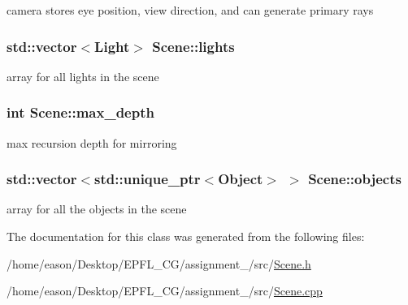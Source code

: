 camera stores eye position, view direction, and can generate primary rays 

\subsubsection[{\texorpdfstring{lights}{lights}}]{\setlength{\rightskip}{0pt plus 5cm}std\+::vector$<${\bf Light}$>$ Scene\+::lights\hspace{0.3cm}{\ttfamily [private]}}\hypertarget{classScene_ab3625e4ac3c6e47156edd23e2421e828}{}\label{classScene_ab3625e4ac3c6e47156edd23e2421e828}


array for all lights in the scene 

\subsubsection[{\texorpdfstring{max\+\_\+depth}{max_depth}}]{\setlength{\rightskip}{0pt plus 5cm}int Scene\+::max\+\_\+depth\hspace{0.3cm}{\ttfamily [private]}}\hypertarget{classScene_a9150039f4d2c46a617b51c7920142d52}{}\label{classScene_a9150039f4d2c46a617b51c7920142d52}


max recursion depth for mirroring 

\subsubsection[{\texorpdfstring{objects}{objects}}]{\setlength{\rightskip}{0pt plus 5cm}std\+::vector$<$std\+::unique\+\_\+ptr$<${\bf Object}$>$ $>$ Scene\+::objects\hspace{0.3cm}{\ttfamily [private]}}\hypertarget{classScene_abbd6f5b3a4639c3b089037519085bf86}{}\label{classScene_abbd6f5b3a4639c3b089037519085bf86}


array for all the objects in the scene 



The documentation for this class was generated from the following files\+:\begin{DoxyCompactItemize}
\item 
/home/eason/\+Desktop/\+E\+P\+F\+L\+\_\+\+C\+G/assignment\+\_/src/\hyperlink{Scene_8h}{Scene.\+h}\item 
/home/eason/\+Desktop/\+E\+P\+F\+L\+\_\+\+C\+G/assignment\+\_/src/\hyperlink{Scene_8cpp}{Scene.\+cpp}\end{DoxyCompactItemize}
